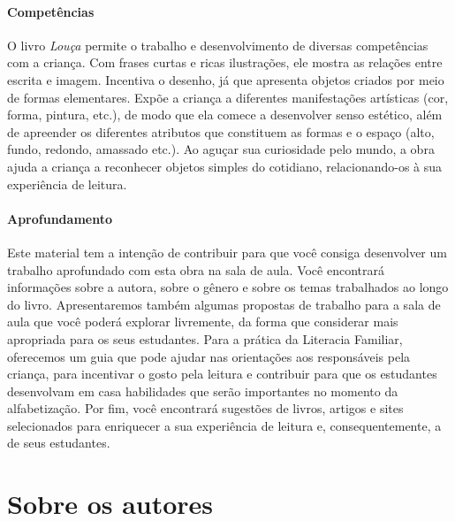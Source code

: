 \documentclass[11pt]{extarticle}
\begin{document}
\paragraph{Competências} O livro \textit{Louça} permite o trabalho e desenvolvimento de diversas competências com a criança. Com frases curtas e ricas ilustrações, ele mostra as relações entre escrita e imagem. Incentiva o desenho, já que apresenta objetos criados por meio de formas elementares. Expõe a criança a diferentes manifestações artísticas (cor, forma, pintura, etc.), de modo que ela comece a desenvolver senso estético, além de apreender os diferentes atributos que constituem as formas e o espaço (alto, fundo, redondo, amassado etc.). Ao aguçar sua curiosidade pelo mundo, a obra ajuda a criança a reconhecer objetos simples do cotidiano, relacionando-os à sua experiência de leitura.

\paragraph{Aprofundamento} Este material tem a 
intenção de contribuir para que você consiga desenvolver um trabalho aprofundado 
com esta obra na sala de aula. Você encontrará informações sobre a autora, sobre 
o gênero e sobre os temas trabalhados ao longo do livro. Apresentaremos também 
algumas propostas de trabalho para a sala de aula que você poderá explorar livremente, 
da forma que considerar mais apropriada para os seus estudantes. Para a prática 
da Literacia Familiar, oferecemos um guia que pode ajudar nas orientações aos 
responsáveis pela criança, para incentivar o gosto pela leitura e contribuir para 
que os estudantes desenvolvam em casa habilidades que serão importantes no momento 
da alfabetização. Por fim, você encontrará sugestões de livros, artigos e sites 
selecionados para enriquecer a sua experiência de leitura e, 
consequentemente, a de seus estudantes.



\section{Sobre os autores}

\reversemarginpar
\marginparwidth=5cm
\end{document}
